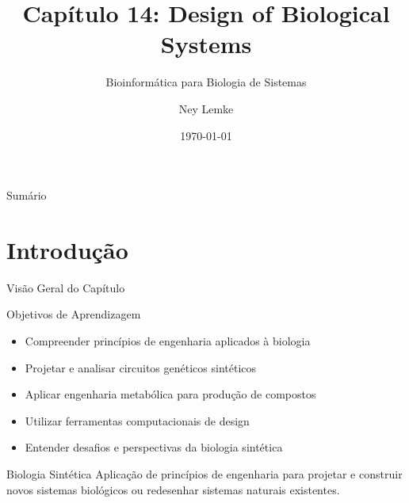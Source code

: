 


\title[Cap. 14: Design of Biological Systems]{Capítulo 14: Design of Biological Systems}
\subtitle{Bioinformática para Biologia de Sistemas}
\author{Ney Lemke}
\date{\today}



\begin{frame}
\titlepage
\end{frame}

\begin{frame}{Sumário}
\tableofcontents
\end{frame}

\section{Introdução}

\begin{frame}{Visão Geral do Capítulo}
\begin{block}{Objetivos de Aprendizagem}
\begin{itemize}
    \item Compreender princípios de engenharia aplicados à biologia
    \item Projetar e analisar circuitos genéticos sintéticos
    \item Aplicar engenharia metabólica para produção de compostos
    \item Utilizar ferramentas computacionais de design
    \item Entender desafios e perspectivas da biologia sintética
\end{itemize}
\end{block}

\vspace{0.3cm}

\begin{exampleblock}{Biologia Sintética}
Aplicação de princípios de engenharia para projetar e construir novos sistemas biológicos ou redesenhar sistemas naturais existentes.
\end{exampleblock}
\end{frame}

